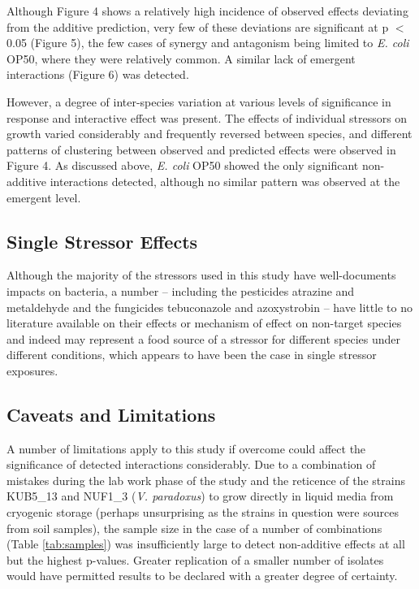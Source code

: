 \documentclass[final,1p,times]{elsarticle}
\begin{document}
Although Figure 4 shows a relatively high incidence of observed effects deviating from the additive prediction, very few of these deviations are significant at p $<$ 0.05 (Figure 5), the few cases of synergy and antagonism being limited to \textit{E. coli} OP50, where they were relatively common. A similar lack of emergent interactions (Figure 6) was detected. 

However, a degree of inter-species variation at various levels of significance in response and interactive effect was present. The effects of individual stressors on growth varied considerably and frequently reversed between species, and different patterns of clustering between observed and predicted effects were observed in Figure 4. As discussed above, \textit{E. coli} OP50 showed the only significant non-additive interactions detected, although no similar pattern was observed at the emergent level. 

\subsection{Single Stressor Effects}
\label{S:4:2}

Although the majority of the stressors used in this study have well-documents impacts on bacteria, a number – including the pesticides atrazine and metaldehyde and the fungicides tebuconazole and azoxystrobin – have little to no literature available on their effects or mechanism of effect on non-target species and indeed may represent a food source of a stressor for different species under different conditions, which appears to have been the case in single stressor exposures.

\subsection{Caveats and Limitations}
\label{S:4:3}

A number of limitations apply to this study if overcome could affect the significance of detected interactions considerably.  Due to a combination of mistakes during the lab work phase of the study and the reticence of the strains KUB5\_13 and NUF1\_3 (\textit{V. paradoxus}) to grow directly in liquid media from cryogenic storage (perhaps unsurprising as the strains in question were sources from soil samples), the sample size in the case of a number of combinations (Table \ref{tab:samples}) was insufficiently large to detect non-additive effects at all but the highest p-values.  Greater replication of a smaller number of isolates would have permitted results to be declared with a greater degree of certainty. 
\end{document}
